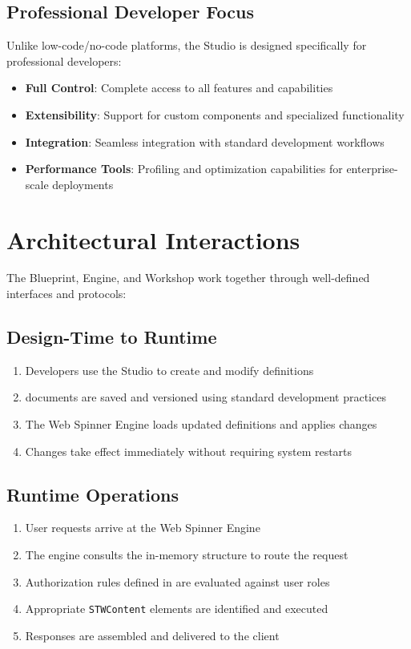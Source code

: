 \subsection{Professional Developer Focus}

Unlike low-code/no-code platforms, the Studio is designed specifically for professional developers:

\begin{itemize}
	\item \textbf{Full Control}: Complete access to all \wbdl{} features and capabilities
	\item \textbf{Extensibility}: Support for custom components and specialized functionality
	\item \textbf{Integration}: Seamless integration with standard development workflows
	\item \textbf{Performance Tools}: Profiling and optimization capabilities for enterprise-scale deployments
\end{itemize}

\section{Architectural Interactions}
\label{sec:architectural-interactions}

The Blueprint, Engine, and Workshop work together through well-defined interfaces and protocols:

\subsection{Design-Time to Runtime}

\begin{enumerate}
	\item Developers use the Studio to create and modify \webbase{} definitions
	\item \wbdl{} documents are saved and versioned using standard development practices
	\item The Web Spinner Engine loads updated \webbase{} definitions and applies changes
	\item Changes take effect immediately without requiring system restarts
\end{enumerate}

\subsection{Runtime Operations}

\begin{enumerate}
	\item User requests arrive at the Web Spinner Engine
	\item The engine consults the in-memory \webbase{} structure to route the request
	\item Authorization rules defined in \wbdl{} are evaluated against user roles
	\item Appropriate \texttt{STWContent} elements are identified and executed
	\item Responses are assembled and delivered to the client
\end{enumerate}

